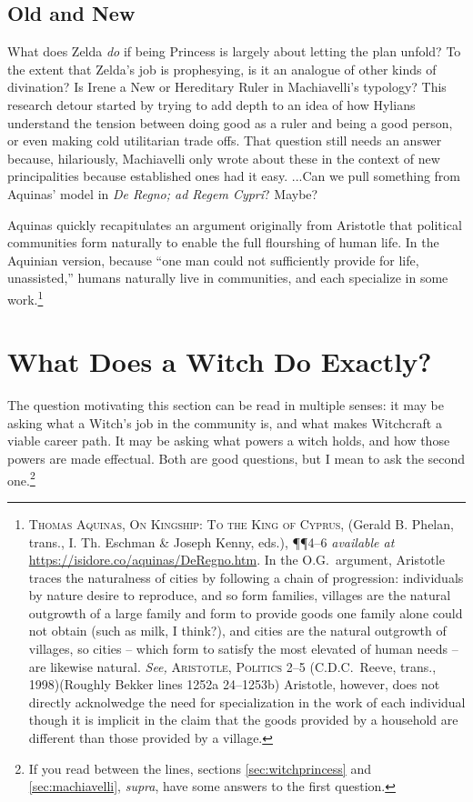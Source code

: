 \documentclass[../FGP.tex]{subfiles}
\begin{document}
\subsection{Old and New} 

What does Zelda \emph{do} if being Princess is largely about letting the plan unfold?
To the extent that Zelda's job is prophesying, is it an analogue of other kinds of divination?
Is Irene a New or Hereditary Ruler in Machiavelli's typology?
This research detour started by trying to add depth to an idea of how Hylians understand the tension between doing good as a ruler and being a good person, or even making cold utilitarian trade offs. That question still needs an answer because, hilariously, Machiavelli only wrote about these in the context of new principalities because established ones had it easy. 
 ...Can we pull something from Aquinas' model in \textit{De Regno; ad Regem Cypri}? Maybe? 

Aquinas quickly recapitulates an argument originally from Aristotle that political communities form naturally to enable the full flourshing of human life. In the Aquinian version, because ``one man could not sufficiently provide for life, unassisted,'' humans naturally live in communities, and each specialize in some work.\footnote{%
  \textsc{Thomas Aquinas, On Kingship: To the King of Cyprus}, (Gerald B. Phelan, trans., I. Th. Eschman \& Joseph Kenny, eds.), \P\P4--6 \textit{available at} \url{https://isidore.co/aquinas/DeRegno.htm}. In the O.G.~argument, Aristotle traces the naturalness of cities by following a chain of progression: individuals by nature desire to reproduce, and so form families, villages are the natural outgrowth of a large family and form to provide goods one family alone could not obtain (such as milk, I think?), and cities are the natural outgrowth of villages, so cities -- which form to satisfy the most elevated of human needs -- are likewise natural. \textit{See,} \textsc{Aristotle, Politics} 2--5 (C.D.C.~Reeve, trans., 1998)(Roughly Bekker lines 1252a 24--1253b) Aristotle, however, does not directly acknolwedge the need for specialization in the work of each individual though it is implicit in the claim that the goods provided by a household are different than those provided by a village.} %



\section{What Does a Witch Do Exactly?}
The question motivating this section can be read in multiple senses: it may be asking what a Witch's job in the community is, and what makes Witchcraft a viable career path. It may be asking what powers a witch holds, and how those powers are made effectual. Both are good questions, but I mean to ask the second one.\footnote{If you read between the lines, sections \ref{sec:witchprincess} and \ref{sec:machiavelli}, \textit{supra}, have some answers to the first question.}
\end{document}

